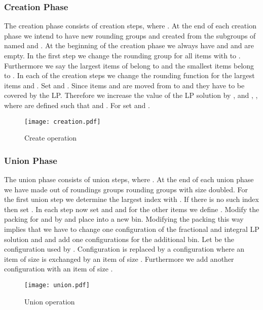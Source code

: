\documentclass[a4paper,11pt]{article}
\begin{document}
\subsubsection*{Creation Phase}
The creation phase consists of  creation steps, where . At the end of each creation phase we intend
to have new rounding groups  and  created from the subgroups of  named  and .
At the beginning of the creation phase we always have  and  and  are empty.
In the first step we change the rounding group
for all items  with  to . 
Furthermore we say the  largest items of  belong to  and the  smallest items belong to .
In each of the  creation steps we change the rounding function for the largest items  
and . Set 
and . Since items  and  are moved from  to  
and  they have to be covered by
the LP. Therefore we increase the value of the LP solution by ,  and 
, , where  are defined such that 
 and . For  set 
and .
\begin{figure}
\texttt{[image: creation.pdf]}
\caption{Create operation}
\end{figure}
\subsubsection*{Union Phase}
The union phase consists of  union steps, where . At the end of each union phase we have made
out of  roundings groups  rounding groups with size doubled.
For the first union step we determine the largest index  with . If there is no such index then
set . In each step now set  and  and for the other items 
we define . Modify the packing for  and  by  and
place  into a new bin. Modifying the packing this way implies that we have to change one configuration
of the fractional and integral LP solution  and  and add one configurations for the additional bin. 
Let  be the
configuration used by . Configuration  is replaced by a configuration  where an item
of size  is exchanged by an item of size . Furthermore we add another 
configuration  with an item of size .
\begin{figure}
\texttt{[image: union.pdf]}
\caption{Union operation}
\end{figure}
\end{document}
